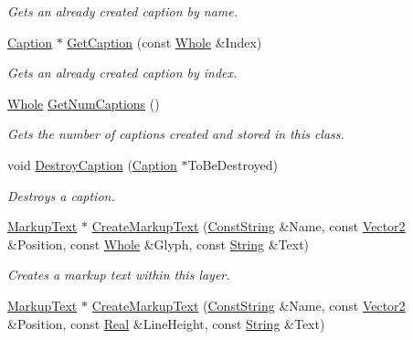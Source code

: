 \begin{DoxyCompactItemize}
\begin{DoxyCompactList}\small\item\em Gets an already created caption by name. \item\end{DoxyCompactList}\item 
\hyperlink{classphys_1_1UI_1_1Caption}{Caption} $\ast$ \hyperlink{classphys_1_1UI_1_1Layer_a78334cb4e75aaa559bfb76af31e2d0e0}{GetCaption} (const \hyperlink{namespacephys_a460f6bc24c8dd347b05e0366ae34f34a}{Whole} \&Index)
\begin{DoxyCompactList}\small\item\em Gets an already created caption by index. \item\end{DoxyCompactList}\item 
\hyperlink{namespacephys_a460f6bc24c8dd347b05e0366ae34f34a}{Whole} \hyperlink{classphys_1_1UI_1_1Layer_a0e8df4319db95b3573c53b041686e66b}{GetNumCaptions} ()
\begin{DoxyCompactList}\small\item\em Gets the number of captions created and stored in this class. \item\end{DoxyCompactList}\item 
void \hyperlink{classphys_1_1UI_1_1Layer_a62195d1732e1d200f0b847331ef6d3b0}{DestroyCaption} (\hyperlink{classphys_1_1UI_1_1Caption}{Caption} $\ast$ToBeDestroyed)
\begin{DoxyCompactList}\small\item\em Destroys a caption. \item\end{DoxyCompactList}\item 
\hyperlink{classphys_1_1UI_1_1MarkupText}{MarkupText} $\ast$ \hyperlink{classphys_1_1UI_1_1Layer_a403ff55e8e15409db1a97fe210b5a38f}{CreateMarkupText} (\hyperlink{namespacephys_a5ce5049f8b4bf88d6413c47b504ebb31}{ConstString} \&Name, const \hyperlink{classphys_1_1Vector2}{Vector2} \&Position, const \hyperlink{namespacephys_a460f6bc24c8dd347b05e0366ae34f34a}{Whole} \&Glyph, const \hyperlink{namespacephys_aa03900411993de7fbfec4789bc1d392e}{String} \&Text)
\begin{DoxyCompactList}\small\item\em Creates a markup text within this layer. \item\end{DoxyCompactList}\item 
\hyperlink{classphys_1_1UI_1_1MarkupText}{MarkupText} $\ast$ \hyperlink{classphys_1_1UI_1_1Layer_a50a71dac395e7143c385119da669df8e}{CreateMarkupText} (\hyperlink{namespacephys_a5ce5049f8b4bf88d6413c47b504ebb31}{ConstString} \&Name, const \hyperlink{classphys_1_1Vector2}{Vector2} \&Position, const \hyperlink{namespacephys_af7eb897198d265b8e868f45240230d5f}{Real} \&LineHeight, const \hyperlink{namespacephys_aa03900411993de7fbfec4789bc1d392e}{String} \&Text)

\end{DoxyCompactItemize}
